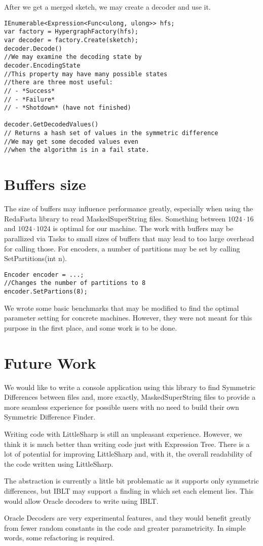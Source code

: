 After we get a merged sketch, we may create a decoder and use it.
\begin{lstlisting}
IEnumerable<Expression<Func<ulong, ulong>> hfs;
var factory = HypergraphFactory(hfs);
var decoder = factory.Create(sketch);
decoder.Decode()
//We may examine the decoding state by
decoder.EncodingState
//This property may have many possible states
//there are three most useful:
// - *Success*
// - *Failure*
// - *Shotdown* (have not finished) 

decoder.GetDecodedValues() 
// Returns a hash set of values in the symmetric difference
//We may get some decoded values even
//when the algorithm is in a fail state.
\end{lstlisting}

\section{Buffers size}
The size of buffers may influence performance greatly, especially when using the RedaFasta library to read MaskedSuperString files. Something between  $1024 \cdot 16$ and $1024 \cdot 1024$ is optimal for our machine. The work with buffers may be parallized via Tasks to small sizes of buffers that may lead to too large overhead for calling those. For encoders, a number of partitions may be set by calling SetPartitions(int n).

\begin{lstlisting}
Encoder encoder = ...;
//Changes the number of partitions to 8 
encoder.SetPartions(8);
\end{lstlisting}

We wrote some basic benchmarks that may be modified to find the optimal parameter setting for concrete machines. However, they were not meant for this purpose in the first place, and some work is to be done.

\section{Future Work} 

We would like to write a console application using this library to find Symmetric Differences between files and, more exactly, MaskedSuperString files to provide a more seamless experience for possible users with no need to build their own Symmetric Difference Finder.

Writing code with LittleSharp is still an unpleasant experience. However, we think it is much better than writing code just with Expression Tree. There is a lot of potential for improving LittleSharp and, with it, the overall readability of the code written using LittleSharp.

The abstraction is currently a little bit problematic as it supports only symmetric differences, but IBLT may support a finding in which set each element lies. This would allow Oracle decoders to write using  IBLT. 

Oracle Decoders are very experimental features, and they would benefit greatly from fewer random constants in the code and greater parametricity. In simple words, some refactoring is required.
